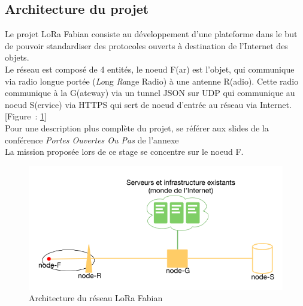 \documentclass{article}
\begin{document}
\subsection{Architecture du projet}
Le projet LoRa Fabian consiste au développement d'une plateforme dans le but de pouvoir standardiser des protocoles ouverts à destination de l'Internet des objets.\\
Le réseau est composé de 4 entités, le noeud F(ar) est l'objet, qui communique via radio longue portée (\emph{Lo}ng \emph{Ra}nge Radio) à une antenne R(adio). Cette radio communique à la G(ateway) via un tunnel JSON sur UDP qui communique au noeud S(ervice) via \textsc{HTTPS} qui sert de noeud d'entrée au réseau via Internet. [Figure~: \ref{fig:archi}]\\
Pour une description plus complète du projet, se référer aux slides de la conférence  \emph{Portes Ouvertes Ou Pas} de l'annexe \\%
La mission proposée lors de ce stage se concentre sur le noeud F.
\begin{figure}[h]
	\begin{center}
		\includegraphics[scale=0.4]{../res/img/archi}
		\caption{Architecture du réseau LoRa Fabian}
		\label{fig:archi}
	\end{center}
\end{figure}
\end{document}
